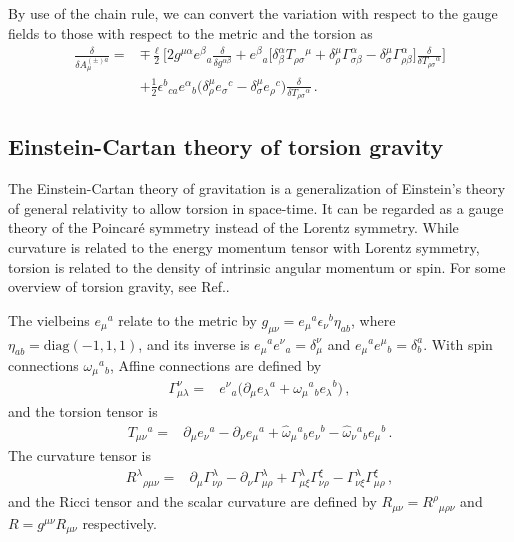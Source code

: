 \documentclass[11pt]{article}
\newcommand{\nn}{\nonumber}
\numberwithin{equation}{section}
\begin{document}
By use of the chain rule, we can convert the variation with respect to the gauge fields
to those with respect to the metric and the torsion as
\begin{align}
  \frac{\delta}{\delta A_\mu^{(\pm)a}}=&
\mp \frac{\ell}{2}
\bigg[
2 g^{\mu\alpha} e^\beta{}_a  \frac{\delta}{\delta g^{\alpha\beta}}
+e^\beta{}_a
\big[ 
\delta^\alpha_\beta T_{\rho\sigma}{}^\mu
+\delta^\mu_\rho  \Gamma_{\sigma\beta}^\alpha
-\delta^\mu_\sigma   \Gamma_{\rho\beta}^\alpha
\big] \frac{\delta}{\delta T_{\rho\sigma}{}^\alpha}
\bigg]
\nn\\&
+\frac{1}{2} \epsilon^b{}_{ca} e^\alpha{}_b \big( \delta^\mu_\rho e_\sigma{}^c 
-\delta^\mu_\sigma e_\rho{}^c
\big)
\frac{\delta}{\delta T_{\rho\sigma}{}^\alpha}
 \,.
\label{eq:variation_change}
\end{align}





\subsection{Einstein-Cartan theory of torsion gravity}
\label{sec:einst-cart-theory}

The Einstein-Cartan theory of gravitation is a generalization of
Einstein's theory of general relativity to allow torsion in
space-time.  It can be regarded as a gauge theory of the Poincar{\'e}
symmetry instead of the Lorentz symmetry\cite{Kibble:1961ba}.  While
curvature is related to the energy momentum tensor with Lorentz
symmetry, torsion is related to the density of intrinsic angular
momentum or spin.
For some overview of torsion gravity, see Ref.\cite{Torsion_gravity}.

The vielbeins $e_\mu{}^a$ relate to the metric
by $g_{\mu\nu}=e_\mu{}^a \epsilon_\nu{}^b \eta_{ab}$, where $\eta_{ab}=\text{diag} (-1,1,1)$,
and its inverse is $e_\mu{}^a e^\nu{}_a=\delta^\nu_\mu$ and
$e_\mu{}^a e^\mu{}_b=\delta^a_b$.
With spin connections $\omega_\mu{}^a{}_b$,
Affine connections are defined by
\begin{align}
  \Gamma^\nu_{\mu\lambda}=& e^\nu{}_a \big( \partial_\mu e_\lambda{}^a + \omega_\mu{}^a{}_b e_\lambda{}^b\big) \,,
\end{align}
and the torsion tensor is
\begin{align}
  T_{\mu\nu}{}^a =& 
\partial_\mu {e}_\nu{}^a
-\partial_\nu {e}_\mu{}^a
+\hat{\omega}_\mu{}^a{}_b {e}_\nu{}^b
-\hat{\omega}_\nu{}^a{}_b {e}_\mu{}^b \,.
\end{align}
The curvature tensor is
\begin{align}
    R^{\lambda}{}_{\rho\mu\nu} =&
\partial_\mu \Gamma^\lambda_{\nu\rho} -\partial_\nu \Gamma^\lambda_{\mu\rho} 
+ \Gamma^\lambda_{\mu\xi} \Gamma^\xi_{\nu\rho} -  \Gamma^\lambda_{\nu\xi} \Gamma^\xi_{\mu\rho}
\,,
\end{align}
and the Ricci tensor and the scalar curvature are defined by
$R_{\mu\nu}=R^\rho{}_{\mu\rho\nu}$ and $R=g^{\mu\nu}R_{\mu\nu}$ respectively.
\end{document}
